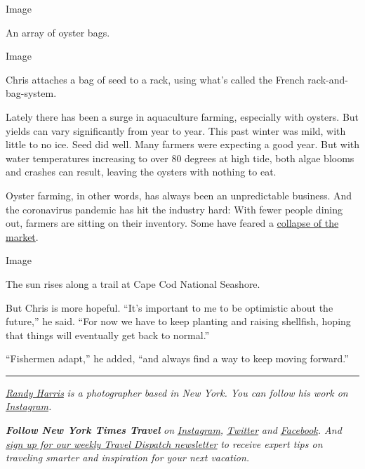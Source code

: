 Image

An array of oyster bags.

Image

Chris attaches a bag of seed to a rack, using what's called the French
rack-and-bag-system.

Lately there has been a surge in aquaculture farming, especially with
oysters. But yields can vary significantly from year to year. This past
winter was mild, with little to no ice. Seed did well. Many farmers were
expecting a good year. But with water temperatures increasing to over 80
degrees at high tide, both algae blooms and crashes can result, leaving
the oysters with nothing to eat.

Oyster farming, in other words, has always been an unpredictable
business. And the coronavirus pandemic has hit the industry hard: With
fewer people dining out, farmers are sitting on their inventory. Some
have feared a
\href{https://www.ecori.org/aquaculture/2020/5/5/with-restaurants-shuttered-oyster-farmers-face-market-collapse}{collapse
of the market}.

Image

The sun rises along a trail at Cape Cod National Seashore.

But Chris is more hopeful. ``It's important to me to be optimistic about
the future,'' he said. ``For now we have to keep planting and raising
shellfish, hoping that things will eventually get back to normal.''

``Fishermen adapt,'' he added, ``and always find a way to keep moving
forward.''

\begin{center}\rule{0.5\linewidth}{\linethickness}\end{center}

\href{https://www.iamrandyharris.com/}{\emph{Randy Harris}} \emph{is a
photographer based in New York. You can follow his work on}
\href{https://www.instagram.com/iamrandyharris/}{\emph{Instagram}}\emph{.}

\emph{\textbf{Follow New York Times Travel}} \emph{on}
\href{https://www.instagram.com/nytimestravel/}{\emph{Instagram}}\emph{,}
\href{https://twitter.com/nytimestravel}{\emph{Twitter}} \emph{and}
\href{https://www.facebookcorewwwi.onion/nytimestravel/}{\emph{Facebook}}\emph{.
And}
\href{https://www.nytimes3xbfgragh.onion/newsletters/traveldispatch}{\emph{sign
up for our weekly Travel Dispatch newsletter}} \emph{to receive expert
tips on traveling smarter and inspiration for your next vacation.}

